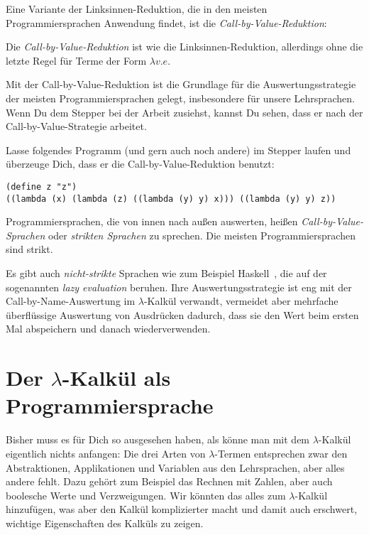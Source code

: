 Eine Variante der Linksinnen-Reduktion, die in den meisten
Programmiersprachen Anwendung findet, ist die
\textit{Call-by-Value-Reduktion}:
%
\begin{definition}\label{def:call-by-value}
    Die \textit{Call-by-Value-Reduktion} ist wie die
  Linksinnen-Reduktion, allerdings ohne die letzte Regel für Terme der
  Form $\lambda v.e$.
\end{definition}
%
Mit der Call-by-Value-Reduktion ist die Grundlage für die
Auswertungsstrategie der meisten Programmiersprachen gelegt,
insbesondere für unsere Lehrsprachen.  Wenn Du dem Stepper bei der
Arbeit zusiehst, kannst Du sehen, dass er nach der
Call-by-Value-Strategie arbeitet.
%
\begin{aufgabeinline}
  Lasse folgendes Programm (und gern auch noch andere) im Stepper
  laufen und überzeuge Dich, dass er die Call-by-Value-Reduktion
  benutzt:
\begin{lstlisting}
(define z "z")
((lambda (x) (lambda (z) ((lambda (y) y) x))) ((lambda (y) y) z))
\end{lstlisting}
\end{aufgabeinline}
%
Programmiersprachen, die von innen nach außen auswerten, heißen
\textit{Call-by-Value-Sprachen} oder
\textit{strikten Sprachen} zu sprechen.
Die meisten Programmiersprachen sind strikt.

Es gibt auch \textit{nicht-strikte}
Sprachen wie zum Beispiel Haskell~\cite{Haskell2010},
die auf der sogenannten \textit{lazy evaluation} beruhen.  Ihre
Auswertungsstrategie ist eng mit der Call-by-Name-Auswertung im
$\lambda$-Kalkül verwandt, vermeidet
aber mehrfache überflüssige Auswertung von Ausdrücken dadurch, dass sie den
Wert beim ersten Mal abspeichern und danach wiederverwenden.

\section{Der $\lambda$-Kalkül als Programmiersprache}
\label{sec:lambdaprog}

Bisher muss es für Dich so ausgesehen haben, als könne man mit dem
$\lambda$-Kalkül eigentlich nichts anfangen: Die drei Arten von
$\lambda$-Termen entsprechen zwar den Abstraktionen, Applikationen und
Variablen aus den Lehrsprachen, aber alles andere fehlt.  Dazu gehört
zum Beispiel das Rechnen mit Zahlen, aber auch boolesche Werte und
Verzweigungen. Wir könnten das alles zum $\lambda$-Kalkül hinzufügen,
was aber den Kalkül komplizierter macht und damit auch erschwert,
wichtige Eigenschaften des Kalküls zu zeigen.

